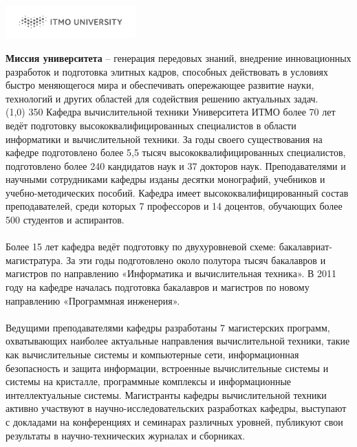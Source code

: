 \documentclass[a5paper,14pt]{report}
\begin{document}
\pagestyle{empty}
\begin{flushright}
\includegraphics[width=5cm]{ITMO_log}
\end{flushright}
\textbf{Миссия университета} -- генерация передовых знаний, внедрение инновационных разработок и подготовка элитных кадров, способных действовать в условиях быстро меняющегося мира и обеспечивать опережающее развитие науки, технологий и других областей для содействия решению актуальных задач. 
\\\line(1,0) {350}
Кафедра вычислительной техники Университета ИТМО более 70 лет ведёт подготовку высококвалифицированных специалистов в области информатики и вычислительной техники. За годы своего существования на кафедре подготовлено более 5,5 тысяч высококвалифицированных специалистов, подготовлено более 240 кандидатов наук и 37 докторов наук. Преподавателями и научными сотрудниками кафедры изданы десятки монографий, учебников и учебно-методических пособий. Кафедра имеет высококвалифицированный состав преподавателей, среди которых 7 профессоров и 14 доцентов, обучающих более 500 студентов и аспирантов.
\\\\Более 15 лет кафедра ведёт подготовку по двухуровневой схеме: бакалавриат-магистратура. За эти годы подготовлено около полутора тысяч бакалавров и магистров по направлению «Информатика и вычислительная техника». В 2011 году на кафедре началась подготовка бакалавров и магистров по новому направлению «Программная инженерия». 
\\\\Ведущими преподавателями кафедры разработаны 7 магистерских программ, охватывающих наиболее актуальные направления вычислительной техники, такие как вычислительные системы и компьютерные сети, информационная безопасность и защита информации, встроенные вычислительные системы и системы на кристалле, программные комплексы и информационные интеллектуальные системы. Магистранты кафедры вычислительной техники активно участвуют в научно-исследовательских разработках кафедры, выступают с докладами на конференциях и семинарах различных уровней, публикуют свои результаты в научно-технических журналах и сборниках.
\end{document}
